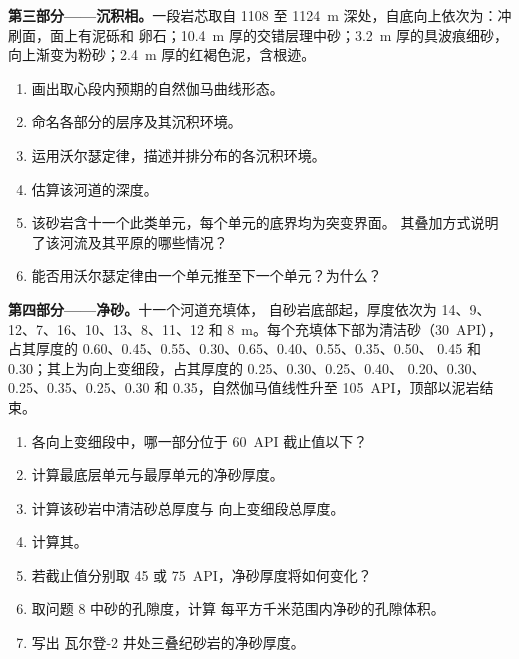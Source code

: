 \begin{problem}
\medskip\noindent\textbf{第三部分——沉积相。}一段岩芯取自 1108 至
\qty{1124}{m} 深处，自底向上依次为：冲刷面，面上有泥砾和
卵石；\qty{10.4}{m} 厚的交错层理中砂；\qty{3.2}{m} 厚的具波痕细砂，
向上渐变为粉砂；\qty{2.4}{m} 厚的红褐色泥，含根迹。
\begin{enumerate}[resume]
\item 画出取心段内预期的自然伽马曲线形态。
\item 命名各部分的层序及其沉积环境。
\item 运用沃尔瑟定律，描述并排分布的各沉积环境。
\item 估算该河道的深度。
\item 该砂岩含十一个此类单元，每个单元的底界均为突变界面。
  其叠加方式说明了该河流及其平原的哪些情况？
\item 能否用沃尔瑟定律由一个单元推至下一个单元？为什么？
\end{enumerate}

\medskip\noindent\textbf{第四部分——净砂。}十一个河道充填体，
自砂岩底部起，厚度依次为 14、9、12、7、16、10、13、8、11、12 和
\qty{8}{m}。每个充填体下部为清洁砂（\qty{30}{API}），占其厚度的
0.60、0.45、0.55、0.30、0.65、0.40、0.55、0.35、0.50、
0.45 和 0.30；其上为向上变细段，占其厚度的 0.25、0.30、0.25、0.40、
0.20、0.30、0.25、0.35、0.25、0.30 和 0.35，自然伽马值线性升至
\qty{105}{API}，顶部以泥岩结束。
\begin{enumerate}[resume]
\item 各向上变细段中，哪一部分位于 \qty{60}{API}
  截止值以下？
\item 计算最底层单元与最厚单元的净砂厚度。
\item 计算该砂岩中清洁砂总厚度与
  向上变细段总厚度。
\item 计算其。
\item 若截止值分别取 45 或
  \qty{75}{API}，净砂厚度将如何变化？
\item 取问题 8 中砂的孔隙度，计算
  每平方千米范围内净砂的孔隙体积。
\item 写出 瓦尔登-2 井处三叠纪砂岩的净砂厚度。
\end{enumerate}
\end{problem}
